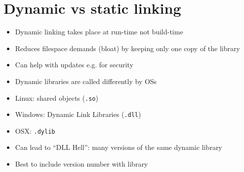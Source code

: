 \documentclass{article}
\begin{document}
\section{Dynamic vs static linking}
\begin{itemize}
\item Dynamic linking takes place at run-time not build-time
\item Reduces filespace demands (bloat) by keeping only one copy of the library
\item Can help with updates e.g. for security
\item Dynamic libraries are called differently by OSs
\item Linux: shared objects (\verb!.so!)
\item Windows: Dynamic Link Libraries (\verb!.dll!)
\item OSX: \verb!.dylib!
\item Can lead to ``DLL Hell'': many versions of the same dynamic library
\item Best to include version number with library
\end{itemize}
\end{document}
